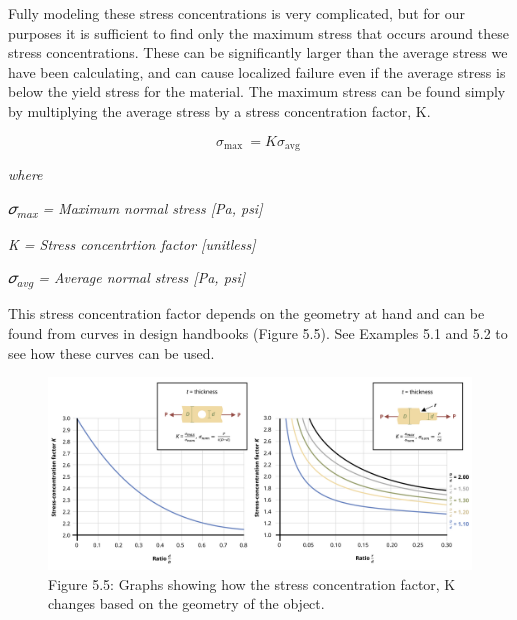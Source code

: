 \documentclass[
  letterpaper,
  DIV=11,
  numbers=noendperiod]{scrreprt}
\begin{document}
Fully modeling these stress concentrations is very complicated, but for
our purposes it is sufficient to find only the maximum stress that
occurs around these stress concentrations. These can be significantly
larger than the average stress we have been calculating, and can cause
localized failure even if the average stress is below the yield stress
for the material. The maximum stress can be found simply by multiplying
the average stress by a stress concentration factor, K.

\[
\sigma_{\text {max }}=K \sigma_{\text {avg }}\]

\emph{where}

\emph{𝜎\textsubscript{max} = Maximum normal stress {[}Pa, psi{]}}

\emph{K = Stress concentrtion factor {[}unitless{]}}

\emph{𝜎\textsubscript{avg} = Average normal stress {[}Pa, psi{]}}

This stress concentration factor depends on the geometry at hand and can
be found from curves in design handbooks (Figure 5.5). See Examples 5.1
and 5.2 to see how these curves can be used.

\begin{figure}[H]

{\centering \includegraphics{images/PNGs/Figure 5.5.png}

}

\caption{Figure 5.5: Graphs showing how the stress concentration factor,
K changes based on the geometry of the object.}

\end{figure}%
\end{document}
